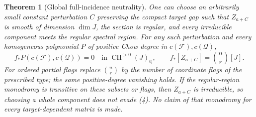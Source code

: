 \documentclass[11pt]{article}
\newtheorem{theorem}{Theorem}
\newcommand{\Q}{\mathbb Q}
\newcommand{\CH}{\operatorname{CH}}
\begin{document}
\begin{theorem}[Global full-incidence neutrality]
One can choose an arbitrarily small constant perturbation $C$ preserving
the compact target gap such that $Z_{a+C}$ is smooth of dimension $\dim J$,
the section is regular, and every irreducible component meets the regular
spectral region. For any such perturbation and every homogeneous polynomial
$P$ of positive Chow degree in $c(\mathcal F),c(\mathcal Q)$,
\[
 f_*P(c(\mathcal F),c(\mathcal Q))=0
       \quad\text{in }\CH^{>0}(J)_\Q,\qquad
 f_*[Z_{a+C}]=\binom nr[J].\tag{4}
\]
For ordered partial flags replace $\binom nr$ by the number of coordinate
flags of the prescribed type; the same positive-degree vanishing holds.
If the regular-region monodromy is transitive on these subsets or flags,
then $Z_{a+C}$ is irreducible, so choosing a whole component does not evade
(4). No claim of that monodromy for every target-dependent matrix is made.
\end{theorem}
\end{document}

